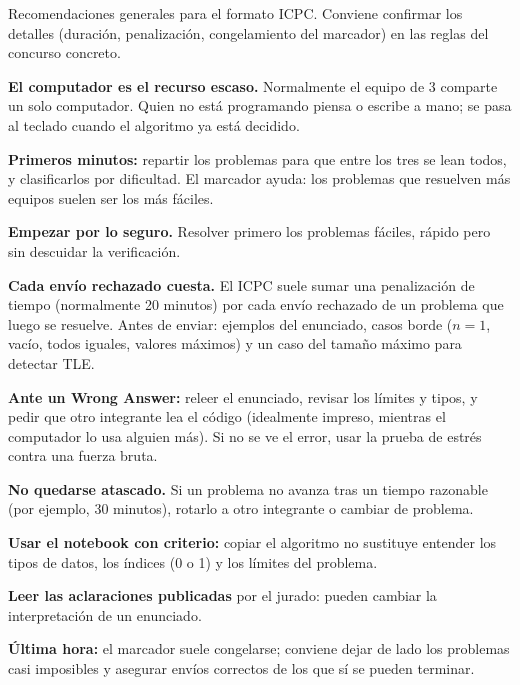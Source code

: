 Recomendaciones generales para el formato ICPC. Conviene confirmar los detalles (duración, penalización, congelamiento del marcador) en las reglas del concurso concreto.

\begin{props}
  \item \textbf{El computador es el recurso escaso.} Normalmente el equipo de 3 comparte un solo computador. Quien no está programando piensa o escribe a mano; se pasa al teclado cuando el algoritmo ya está decidido.
  \item \textbf{Primeros minutos:} repartir los problemas para que entre los tres se lean todos, y clasificarlos por dificultad. El marcador ayuda: los problemas que resuelven más equipos suelen ser los más fáciles.
  \item \textbf{Empezar por lo seguro.} Resolver primero los problemas fáciles, rápido pero sin descuidar la verificación.
  \item \textbf{Cada envío rechazado cuesta.} El ICPC suele sumar una penalización de tiempo (normalmente 20 minutos) por cada envío rechazado de un problema que luego se resuelve. Antes de enviar: ejemplos del enunciado, casos borde (\(n = 1\), vacío, todos iguales, valores máximos) y un caso del tamaño máximo para detectar TLE.
  \item \textbf{Ante un Wrong Answer:} releer el enunciado, revisar los límites y tipos, y pedir que otro integrante lea el código (idealmente impreso, mientras el computador lo usa alguien más). Si no se ve el error, usar la prueba de estrés contra una fuerza bruta.
  \item \textbf{No quedarse atascado.} Si un problema no avanza tras un tiempo razonable (por ejemplo, 30 minutos), rotarlo a otro integrante o cambiar de problema.
  \item \textbf{Usar el notebook con criterio:} copiar el algoritmo no sustituye entender los tipos de datos, los índices (0 o 1) y los límites del problema.
  \item \textbf{Leer las aclaraciones publicadas} por el jurado: pueden cambiar la interpretación de un enunciado.
  \item \textbf{Última hora:} el marcador suele congelarse; conviene dejar de lado los problemas casi imposibles y asegurar envíos correctos de los que sí se pueden terminar.
\end{props}

